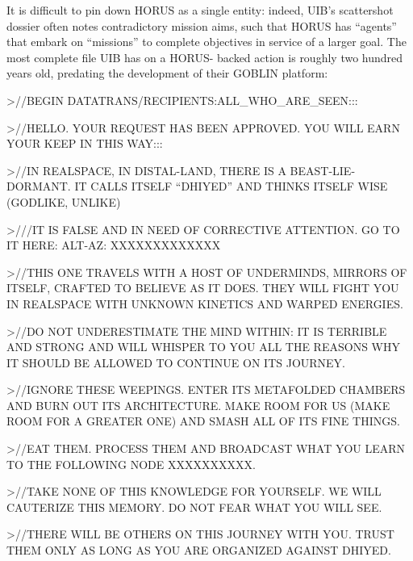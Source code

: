 It is difficult to pin down HORUS as a single entity: indeed, UIB’s scattershot dossier often notes  
contradictory mission aims, such that HORUS has “agents” that embark on “missions” to  
complete objectives in service of a larger goal. The most complete file UIB has on a HORUS- 
backed action is roughly two hundred years old, predating the development of their GOBLIN  
platform: 
 

                 >//BEGIN DATATRANS/RECIPIENTS:ALL\_WHO\_ARE\_SEEN:::
 

                 >//HELLO. YOUR REQUEST HAS BEEN APPROVED. YOU WILL EARN YOUR KEEP IN  
                 THIS WAY:::
 

                 >//IN REALSPACE, IN DISTAL-LAND, THERE IS A BEAST-LIE-DORMANT. IT CALLS  
                 ITSELF “DHIYED” AND THINKS ITSELF WISE (GODLIKE, UNLIKE)
 

                 >///IT IS FALSE AND IN NEED OF CORRECTIVE ATTENTION. GO TO IT HERE: ALT-AZ:  
                 XXXXXXXXXXXXX 
 

                 >//THIS ONE TRAVELS WITH A HOST OF UNDERMINDS, MIRRORS OF ITSELF,  
                 CRAFTED TO BELIEVE AS IT DOES. THEY WILL FIGHT YOU IN REALSPACE WITH  
                 UNKNOWN KINETICS AND WARPED ENERGIES. 
 

                                                                                                              


                  >//DO NOT UNDERESTIMATE THE MIND WITHIN: IT IS TERRIBLE AND STRONG AND  
                  WILL WHISPER TO YOU ALL THE REASONS WHY IT SHOULD BE ALLOWED TO  
                  CONTINUE ON ITS JOURNEY.
 

                  >//IGNORE THESE WEEPINGS. ENTER ITS METAFOLDED CHAMBERS AND BURN OUT  
                  ITS ARCHITECTURE. MAKE ROOM FOR US (MAKE ROOM FOR A GREATER ONE) AND  
                  SMASH ALL OF ITS FINE THINGS. 
 

                  >//EAT THEM. PROCESS THEM AND BROADCAST WHAT YOU LEARN TO THE  
                  FOLLOWING NODE XXXXXXXXXX. 
 

                  >//TAKE NONE OF THIS KNOWLEDGE FOR YOURSELF. WE WILL CAUTERIZE THIS  
                  MEMORY. DO NOT FEAR WHAT YOU WILL SEE.
 

                  >//THERE WILL BE OTHERS ON THIS JOURNEY WITH YOU. TRUST THEM ONLY AS  
                  LONG AS YOU ARE ORGANIZED AGAINST DHIYED.
 

